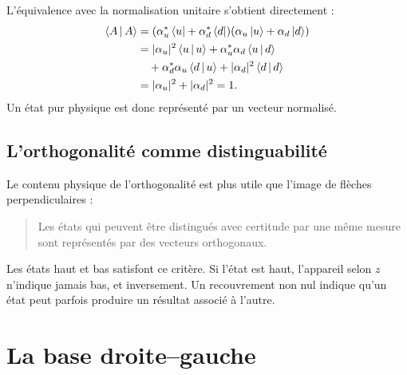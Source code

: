 L’équivalence avec la normalisation unitaire s’obtient directement :
\begin{align}
\left\langle A\,\middle|\,A\right\rangle
&=(\alpha_u^*\left\langle u\right\rvert+\alpha_d^*\left\langle d\right\rvert)
  (\alpha_u\left\lvert u\right\rangle+\alpha_d\left\lvert d\right\rangle)\\
&=|\alpha_u|^2\left\langle u\,\middle|\,u\right\rangle
 +\alpha_u^*\alpha_d\left\langle u\,\middle|\,d\right\rangle\\
&\quad +\alpha_d^*\alpha_u\left\langle d\,\middle|\,u\right\rangle
 +|\alpha_d|^2\left\langle d\,\middle|\,d\right\rangle\\
&=|\alpha_u|^2+|\alpha_d|^2=1.
\end{align}
Un état pur physique est donc représenté par un vecteur normalisé.

\begin{classroomqa}
\end{classroomqa}

\subsection{L’orthogonalité comme distinguabilité}

Le contenu physique de l’orthogonalité est plus utile que l’image de flèches perpendiculaires :

\begin{quote}
Les états qui peuvent être distingués avec certitude par une même mesure sont représentés par des vecteurs orthogonaux.
\end{quote}

Les états haut et bas satisfont ce critère. Si l’état est haut, l’appareil selon \(z\) n’indique jamais bas, et inversement. Un recouvrement non nul indique qu’un état peut parfois produire un résultat associé à l’autre.

\section{La base droite--gauche}

